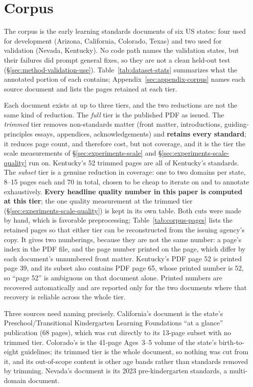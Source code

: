 \section{Corpus}
\label{sec:corpus}

The corpus is the early learning standards documents of six US states: four
used for development (Arizona, California, Colorado, Texas) and two used for
validation (Nevada, Kentucky). No code path names the validation states, but
their failures did prompt general fixes, so they are not a clean held-out test
(\S\ref{sec:method-validation-use}). Table~\ref{tab:dataset-stats} summarizes what the
annotated portion of each contains; Appendix~\ref{sec:appendix-corpus} names
each source document and lists the pages retained at each tier.

Each document exists at up to three tiers, and the two reductions are not the
same kind of reduction. The \emph{full} tier is the published PDF as issued.
The \emph{trimmed} tier removes non-standards matter (front matter,
introductions, guiding-principles essays, appendices, acknowledgements) and
\textbf{retains every standard}; it reduces page count, and therefore cost, but
not coverage, and it is the tier the scale measurements of
\S\ref{sec:experiments-scale} and \S\ref{sec:experiments-scale-quality} run on.
Kentucky's 52 trimmed pages are all of Kentucky's standards. The \emph{subset}
tier is a genuine reduction in coverage: one to two domains per state, 8--15
pages each and 70 in total, chosen to be cheap to iterate on and to annotate
exhaustively. \textbf{Every headline quality number in this paper is computed
at this tier}; the one quality measurement at the trimmed tier
(\S\ref{sec:experiments-scale-quality}) is kept in its own table. Both cuts
were made by hand, which is favorable preprocessing; Table~\ref{tab:corpus-pages}
lists the retained pages so that either tier can be reconstructed from the
issuing agency's copy. It gives two numberings, because they are not the same
number: a page's index in the PDF file, and the page number printed on the
page, which differ by each document's unnumbered front matter. Kentucky's PDF
page 52 is printed page 39, and its subset also contains PDF page 65, whose
printed number is 52, so ``page 52'' is ambiguous on that document alone.
Printed numbers are recovered automatically and are reported only for the two
documents where that recovery is reliable across the whole tier.

Three sources need naming precisely. California's document is the state's
Preschool/Transitional Kindergarten Learning Foundations ``at a glance''
publication (68 pages), which was cut directly to its 13-page subset with no
trimmed tier. Colorado's is the 41-page Ages~3--5 volume of the state's
birth-to-eight guidelines; its trimmed tier is the whole document, so nothing
was cut from it, and its out-of-scope content is other age bands rather than
standards removed by trimming. Nevada's document is its 2023
pre-kindergarten standards, a multi-domain document.

